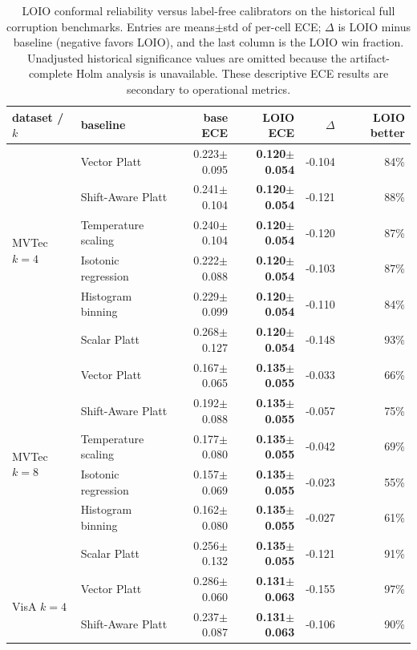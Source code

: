 \begin{table}[pos=t]
\centering
\caption{LOIO conformal reliability versus label-free calibrators on the historical full corruption benchmarks. Entries are means$\pm$std of per-cell ECE; $\Delta$ is LOIO minus baseline (negative favors LOIO), and the last column is the LOIO win fraction. Unadjusted historical significance values are omitted because the artifact-complete Holm analysis is unavailable. These descriptive ECE results are secondary to operational metrics.}
\label{tab:scalar-calibrators}
\footnotesize
\setlength{\tabcolsep}{3pt}
\begin{tabular}{llrrrr}
\toprule
dataset / $k$ & baseline & base ECE & LOIO ECE & $\Delta$ & LOIO better \\
\midrule
\multirow{6}{*}{MVTec $k{=}4$} & Vector Platt & 0.223$\pm$0.095 & \textbf{0.120$\pm$0.054} & -0.104 & 84\% \\
 & Shift-Aware Platt & 0.241$\pm$0.104 & \textbf{0.120$\pm$0.054} & -0.121 & 88\% \\
 & Temperature scaling & 0.240$\pm$0.104 & \textbf{0.120$\pm$0.054} & -0.120 & 87\% \\
 & Isotonic regression & 0.222$\pm$0.088 & \textbf{0.120$\pm$0.054} & -0.103 & 87\% \\
 & Histogram binning & 0.229$\pm$0.099 & \textbf{0.120$\pm$0.054} & -0.110 & 84\% \\
 & Scalar Platt & 0.268$\pm$0.127 & \textbf{0.120$\pm$0.054} & -0.148 & 93\% \\
\midrule
\multirow{6}{*}{MVTec $k{=}8$} & Vector Platt & 0.167$\pm$0.065 & \textbf{0.135$\pm$0.055} & -0.033 & 66\% \\
 & Shift-Aware Platt & 0.192$\pm$0.088 & \textbf{0.135$\pm$0.055} & -0.057 & 75\% \\
 & Temperature scaling & 0.177$\pm$0.080 & \textbf{0.135$\pm$0.055} & -0.042 & 69\% \\
 & Isotonic regression & 0.157$\pm$0.069 & \textbf{0.135$\pm$0.055} & -0.023 & 55\% \\
 & Histogram binning & 0.162$\pm$0.080 & \textbf{0.135$\pm$0.055} & -0.027 & 61\% \\
 & Scalar Platt & 0.256$\pm$0.132 & \textbf{0.135$\pm$0.055} & -0.121 & 91\% \\
\midrule
\multirow{6}{*}{VisA $k{=}4$} & Vector Platt & 0.286$\pm$0.060 & \textbf{0.131$\pm$0.063} & -0.155 & 97\% \\
 & Shift-Aware Platt & 0.237$\pm$0.087 & \textbf{0.131$\pm$0.063} & -0.106 & 90\% \\

\end{tabular}
\end{table}

